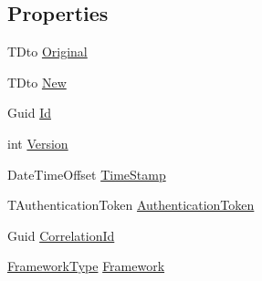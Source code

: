 \subsection*{Properties}
\begin{DoxyCompactItemize}
\item 
T\+Dto \hyperlink{classCqrs_1_1Events_1_1DtoAggregateEvent_a62b5fa272dfbe104d8f37500e3d5cc45_a62b5fa272dfbe104d8f37500e3d5cc45}{Original}
\item 
T\+Dto \hyperlink{classCqrs_1_1Events_1_1DtoAggregateEvent_a702bd5605d7ce538b992c2d43198194c_a702bd5605d7ce538b992c2d43198194c}{New}
\item 
Guid \hyperlink{classCqrs_1_1Events_1_1DtoAggregateEvent_ad5f763ecd79dc9b4882ed15239242d17_ad5f763ecd79dc9b4882ed15239242d17}{Id}
\item 
int \hyperlink{classCqrs_1_1Events_1_1DtoAggregateEvent_a2c3a579eba3effd19cf0ae740ca33389_a2c3a579eba3effd19cf0ae740ca33389}{Version}
\item 
Date\+Time\+Offset \hyperlink{classCqrs_1_1Events_1_1DtoAggregateEvent_a0acde01c4c3cf985f7fc170bc9658278_a0acde01c4c3cf985f7fc170bc9658278}{Time\+Stamp}
\item 
T\+Authentication\+Token \hyperlink{classCqrs_1_1Events_1_1DtoAggregateEvent_a536e92af26632a9590e2ed590232cfcf_a536e92af26632a9590e2ed590232cfcf}{Authentication\+Token}
\item 
Guid \hyperlink{classCqrs_1_1Events_1_1DtoAggregateEvent_a0736560199765e66c50963dfa767b5a5_a0736560199765e66c50963dfa767b5a5}{Correlation\+Id}
\item 
\hyperlink{namespaceCqrs_1_1Messages_af06a7e6cd2609043d0f2f5f3419f81e3_af06a7e6cd2609043d0f2f5f3419f81e3}{Framework\+Type} \hyperlink{classCqrs_1_1Events_1_1DtoAggregateEvent_ad290d76926bccd9038dc5399d037a2ff_ad290d76926bccd9038dc5399d037a2ff}{Framework}

\end{DoxyCompactItemize}
